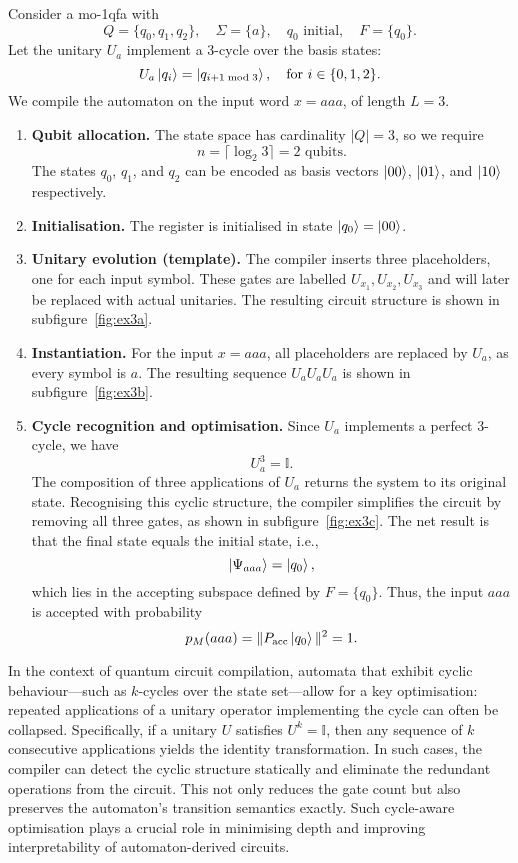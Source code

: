 \begin{example}[Cyclic Automaton, $L = 3$] \label{ex:moqfa-cycle}
Consider a \gls{mo-1qfa} with
\[
Q = \{q_0, q_1, q_2\}, \quad \Sigma = \{a\}, \quad q_0 \text{ initial}, \quad F = \{q_0\}.
\]
Let the unitary $U_a$ implement a 3-cycle over the basis states:
\[
U_a \ket{q_i} = \ket{q_{i+1 \bmod 3}}, \quad \text{for } i \in \{0,1,2\}.
\]
We compile the automaton on the input word $x = aaa$, of length $L = 3$.

\begin{enumerate}
  \item \textbf{Qubit allocation.} The state space has cardinality $|Q| = 3$, so we require
  \[
  n = \lceil \log_2 3 \rceil = 2 \text{ qubits}.
  \]
  The states $q_0$, $q_1$, and $q_2$ can be encoded as basis vectors $\ket{00}$, $\ket{01}$, and $\ket{10}$ respectively.

  \item \textbf{Initialisation.} The register is initialised in state $\ket{q_0} = \ket{00}$.

  \item \textbf{Unitary evolution (template).} The compiler inserts three placeholders, one for each input symbol. These gates are labelled $\boxed{U_{x_1}}, \boxed{U_{x_2}}, \boxed{U_{x_3}}$ and will later be replaced with actual unitaries. The resulting circuit structure is shown in subfigure~\ref{fig:ex3a}.

  \item \textbf{Instantiation.} For the input $x = aaa$, all placeholders are replaced by $U_a$, as every symbol is $a$. The resulting sequence $U_a U_a U_a$ is shown in subfigure~\ref{fig:ex3b}.

  \item \textbf{Cycle recognition and optimisation.} Since $U_a$ implements a perfect 3-cycle, we have
  \[
  U_a^3 = \mathbb{I}.
  \]
  The composition of three applications of $U_a$ returns the system to its original state. Recognising this cyclic structure, the compiler simplifies the circuit by removing all three gates, as shown in subfigure~\ref{fig:ex3c}. The net result is that the final state equals the initial state, i.e.,
  \[
  \ket{\Psi_{aaa}} = \ket{q_0},
  \]
  which lies in the accepting subspace defined by $F = \{q_0\}$. Thus, the input $aaa$ is accepted with probability
  \[
  p_M(aaa) = \|P_{\text{acc}} \ket{q_0}\|^2 = 1.
  \]
\end{enumerate}

In the context of quantum circuit compilation, automata that exhibit cyclic behaviour—such as $k$-cycles over the state set—allow for a key optimisation: repeated applications of a unitary operator implementing the cycle can often be collapsed. Specifically, if a unitary $U$ satisfies $U^k = \mathbb{I}$, then any sequence of $k$ consecutive applications yields the identity transformation. In such cases, the compiler can detect the cyclic structure statically and eliminate the redundant operations from the circuit. This not only reduces the gate count but also preserves the automaton's transition semantics exactly. Such cycle-aware optimisation plays a crucial role in minimising depth and improving interpretability of automaton-derived circuits.


\end{example}
